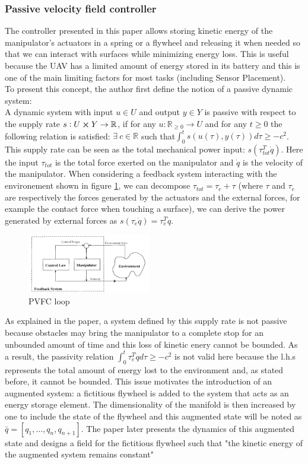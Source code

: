 \subsubsection{Passive velocity field controller}
The controller presented in this paper allows storing kinetic energy of the manipulator's actuators in a spring or a flywheel and releasing it when needed so that we can interact with surfaces while minimizing energy loss. This is useful because the UAV has a limited amount of energy stored in its battery and this is one of the main limiting factors for most tasks (including Sensor Placement). \\
To present this concept, the author first define the notion of a passive dynamic system:\\
A dynamic system with input $u \in U$ and output $y \in Y$ is passive with respect to the supply rate 
$s:U \cross Y \rightarrow \mathbb R$, if for any $u: \mathbb R_{\ge 0} \rightarrow U $ and for any $t\geq 0$ the following relation is satisfied:
$\exists ~ c\in\mathbb R$ such that$ \int_{0}^{t}s(u(\tau),y(\tau))d\tau \geq -c^2$.\\
This supply rate can be seen as the total mechanical power input: $s(\tau_{tot}^{T}\dot{q})$. Here the input $\tau_{tot}$ is the total force exerted on the manipulator 
and $\dot{q}$ is the velocity of the manipulator.
When considering a feedback system interacting with the environement shown in figure \ref{fig:pvfccontrolloop}, we can decompose $\tau_{tot}=\tau_{e}+\tau$ (where $\tau$ and $\tau_{e}$ are respectively the forces generated by the actuators and the external forces, for example the contact force when touching a surface),
we can derive the power generated by external forces as $s(\tau_{e}\dot{q})=\tau_{e}^T \dot{q}$. 
\begin{figure}[h!]
    \centering
    \includegraphics[width=0.48\textwidth]{Images/pvfccontrolloop.png}
    \caption{PVFC loop \cite{li1999passive}}
    \label{fig:pvfccontrolloop}
\end{figure} 
As explained in the paper, a system defined by this supply rate is not passive because obstacles may bring the manipulator to a complete stop for an unbounded amount of time and this loss of kinetic enery cannot be bounded. 
As a result, the passivity relation $\int_{0}^{t}\tau_{e}^T \dot{q}d\tau \geq -c^2$ is not valid here because the l.h.s represents the total amount of energy lost to the environment and, as stated before, it cannot be bounded. 
This issue motivates the introduction of an augmented system: a fictitious flywheel is added to the system that acts as an energy storage element.
The dimensionality of the manifold is then increased by one to include the state of the flywheel and this augmented state will be noted as $\bar{q}=[q_1,...,q_n,q_{n+1}]$.
The paper later presents the dynamics of this augmented state and designs a field for the fictitious flywheel such that "the kinetic energy of the augmented system remains constant"